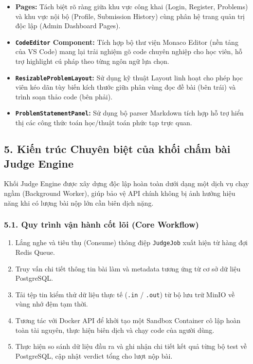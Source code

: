 \documentclass[12pt,a4paper]{article}
\renewcommand{\_}{\BreakableUnderscore}
\providecommand{\tightlist}{%
  \setlength{\itemsep}{0pt}\setlength{\parskip}{0pt}}
\begin{document}
\begin{itemize}
\tightlist
\item
  \textbf{Pages:} Tách biệt rõ ràng giữa khu vực công khai (Login, Register, Problems) và khu vực nội bộ (Profile, Submission History) cùng phân hệ trang quản trị độc lập (Admin Dashboard Pages).
\item
  \textbf{\texttt{CodeEditor} Component:} Tích hợp bộ thư viện Monaco Editor (nền tảng của VS Code) mang lại trải nghiệm gõ code chuyên nghiệp cho học viên, hỗ trợ highlight cú pháp theo từng ngôn ngữ lựa chọn.
\item
  \textbf{\texttt{ResizableProblemLayout}:} Sử dụng kỹ thuật Layout linh hoạt cho phép học viên kéo dãn tùy biến kích thước giữa phân vùng đọc đề bài (bên trái) và trình soạn thảo code (bên phải).
\item
  \textbf{\texttt{ProblemStatementPanel}:} Sử dụng bộ parser Markdown tích hợp hỗ trợ hiển thị các công thức toán học/thuật toán phức tạp trực quan.
\end{itemize}

\subsection{5. Kiến trúc Chuyên biệt của khối chấm bài Judge Engine}

Khối Judge Engine được xây dựng độc lập hoàn toàn dưới dạng một dịch vụ chạy ngầm (Background Worker), giúp bảo vệ API chính không bị ảnh hưởng hiệu năng khi có lượng bài nộp lớn cần biên dịch nặng.

\subsubsection{5.1. Quy trình vận hành cốt lõi (Core Workflow)}

\begin{enumerate}
\def\labelenumi{\arabic{enumi}.}
\tightlist
\item
  Lắng nghe và tiêu thụ (Consume) thông điệp \texttt{JudgeJob} xuất hiện từ hàng đợi Redis Queue.
\item
  Truy vấn chi tiết thông tin bài làm và metadata tương ứng từ cơ sở dữ liệu PostgreSQL.
\item
  Tải tệp tin kiểm thử dữ liệu thực tế (\texttt{.in} / \texttt{.out}) từ bộ lưu trữ MinIO về vùng nhớ đệm tạm thời.
\item
  Tương tác với Docker API để khởi tạo một Sandbox Container cô lập hoàn toàn tài nguyên, thực hiện biên dịch và chạy code của người dùng.
\item
  Thực hiện so sánh dữ liệu đầu ra và ghi nhận chi tiết kết quả từng bộ test về PostgreSQL, cập nhật verdict tổng cho lượt nộp bài.
\end{enumerate}
\end{document}
